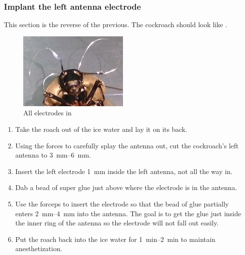\subsubsection{Implant the left antenna electrode}
This section is the reverse of the previous. The cockroach should look like .
\begin{figure}[ht!]
\centering
\includegraphics[scale=0.7]{Surgery Photos/lelectrode.jpg}
\caption{All electrodes in}
\label{fig:lelectrode}
\end{figure}
\begin{enumerate}
\item Take the roach out of the ice water and lay it on its back.
\item Using the forces to carefully splay the antenna out, cut the cockroach's left antenna to \SIrange{3}{6}{\milli\meter}.
\item Insert the left electrode \SI{1}{\milli\meter} inside the left antenna, not all the way in.
\item Dab a bead of super glue just above where the electrode is in the antenna.
\item Use the forceps to insert the electrode so that the bead of glue partially enters \SIrange{2}{4}{\milli\meter} into the antenna.
	\subitem The goal is to get the glue just inside the inner ring of the antenna so the electrode will not fall out easily.
\item Put the roach back into the ice water for \SIrange{1}{2}{\minute} to maintain anesthetization.
\end{enumerate}
      
      
      
      
      
      
      
